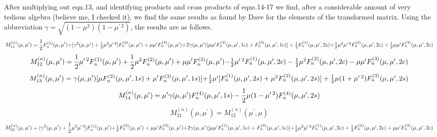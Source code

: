 \documentclass[12pt]{article}
\begin{document}
After multiplying out eqn.13, and identifying products and cross products of eqns.14-17
we find, after a considerable amount of very tedious algebra (believe me, I checked it), we find
the same results as found by Dave \cite{Dave1:Miebib} for the
elements of the transformed matrix. Using the abbreviation $\gamma=\sqrt{(1-\mu^2)
(1-\mu^{\prime \> 2}) }$, the results are as follows.
\begin{equation}
M_{11}^{(n)}(\mu, \mu^\prime)={1\over 2} F_n^{(1)}(\mu, \mu^\prime)+
$$     $$
\lbrack \gamma^2(\mu, \mu^\prime)+{1\over 2} \mu^2 \mu^{\prime \>2} \rbrack 
F_n^{(2)}(\mu, \mu^\prime) + \mu \mu^\prime F_n^{(3)}(\mu, \mu^\prime)
$$     $$
+ 2 \gamma(\mu, \mu^\prime) \lbrack \mu \mu^\prime F_n^{(2)}(\mu, \mu^\prime,1c)
+F_n^{(3)}(\mu, \mu^\prime,1c) \rbrack+ {1\over 2} F_n^{(1)}(\mu, \mu^\prime,2c)
$$      $$
+ {1\over 2} \mu^2 \mu^{\prime \> 2} F_n^{(2)}(\mu, \mu^\prime,2c)
+{1\over 2} \mu \mu^\prime F_n^{(3)}(\mu, \mu^\prime,2c)
\end{equation}
\begin{equation}
M_{12}^{(n)}(\mu, \mu^\prime)={1\over 2} \mu^{\prime \>2} F_n^{(1)}(\mu, \mu^\prime)
+{1\over 2} \mu^2 F_n^{(2)}(\mu, \mu^\prime)+\mu \mu^\prime F_n^{(3)}(\mu, \mu^\prime)
$$    $$
-{1\over 2} \mu^{\prime \>2} F_n^{(1)}(\mu, \mu^\prime,2c)
-{1\over 2} \mu^2 F_n^{(2)}(\mu, \mu^\prime,2c)-\mu \mu^\prime F_n^{(3)}(\mu, \mu^\prime,2c)
\end{equation}
\begin{equation}
M_{13}^{(n)}(\mu, \mu^\prime)=\gamma(\mu, \mu^\prime) \lbrack
\mu  F_n^{(2)}(\mu, \mu^\prime,1s)+\mu^\prime  F_n^{(3)}(\mu, \mu^\prime,1s) \rbrack
$$     $$
+{1\over 2} \mu^\prime \lbrack F_n^{(1)}(\mu, \mu^\prime,2s)+
\mu^{2} F_n^{(2)}(\mu, \mu^\prime,2s) \rbrack
+{1\over 2} \mu (1+\mu^{\prime \> 2} ) F_n^{(3)}(\mu, \mu^\prime,2s) 
\end{equation}
\begin{equation}
M_{14}^{(n)}(\mu, \mu^\prime)= \mu^\prime \gamma(\mu, \mu^\prime)
 F_n^{(4)}(\mu, \mu^\prime,1s)-{1\over 2} \mu (1-\mu^{\prime \> 2} ) F_n^{(4)}(\mu, \mu^\prime,2s)
\end{equation}
\begin{equation}
M_{21}^{(n)}(\mu, \mu^\prime)= M_{12}^{(n)}(\mu^\prime, \mu)
\end{equation}
\begin{equation}
M_{22}^{(n)}(\mu, \mu^\prime)=
 \lbrack \gamma^2(\mu, \mu^\prime)+{1\over 2} \mu^2 \mu^{\prime \> 2} \rbrack
 F_n^{(1)}(\mu, \mu^\prime) 
$$     $$+ {1\over 2} F_n^{(2)}(\mu, \mu^\prime) 
+\mu \mu^\prime F_n^{(3)}(\mu, \mu^\prime)
$$      $$
+2 \gamma(\mu, \mu^\prime) \lbrack
 \mu \mu^\prime F_n^{(1)}(\mu, \mu^\prime, 1c)+F_n^{(3)}(\mu, \mu^\prime, 1c) \rbrack
$$     $$
+{1\over 2} \mu^2\mu^{\prime \> 2} F_n^{(1)}(\mu, \mu^\prime, 2c)
+{1\over 2}  F_n^{(2)}(\mu, \mu^\prime, 2c) +\mu \mu^\prime F_n^{(3)}(\mu, \mu^\prime, 2c)
\end{equation}
\end{document}

